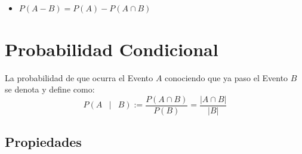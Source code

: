 \documentclass[12pt, fleqn]{report}                             %
\DeclareMathOperator \Space     {\quad}                         %
\DeclareMathOperator \MiniSpace {\;}                            %
\newcommand \Such           {\MiniSpace | \MiniSpace}           %
\theoremstyle{break}                                            %
\newcommand{\Wrap}[1]           {\left( #1 \right)}             %
\newcommand{\Mag}[1]    {\left| #1 \right|}                     %
\begin{document}
\begin{itemize}
                    \item
                        $P(A - B) = P(A) - P(A \cap B)$

                \end{itemize}


        \clearpage
        \section{Probabilidad Condicional}

            La probabilidad de que ocurra el Evento $A$ conociendo que ya paso
            el Evento $B$ se denota y define como:
            \begin{equation*}
                P \Wrap{ A \Such B}
                    := \frac{P(A \cap B)}{P(B)}
                    = \frac{\Mag{A \cap B}}{\Mag{B}}
            \end{equation*}

            \subsection{Propiedades}
\end{document}
